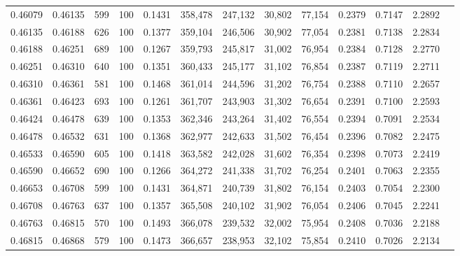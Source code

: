 \begin{tabular}{rrrrrrrrrrrrr}
0.46079 & 0.46135 &   599 & 100 &                                     0.1431 & 358,478 & 247,132 &  30,802 &  77,154 & 0.2379 & 0.7147 & 2.2892 \\
0.46135 & 0.46188 &   626 & 100 &                                     0.1377 & 359,104 & 246,506 &  30,902 &  77,054 & 0.2381 & 0.7138 & 2.2834 \\
0.46188 & 0.46251 &   689 & 100 &                                     0.1267 & 359,793 & 245,817 &  31,002 &  76,954 & 0.2384 & 0.7128 & 2.2770 \\
0.46251 & 0.46310 &   640 & 100 &                                     0.1351 & 360,433 & 245,177 &  31,102 &  76,854 & 0.2387 & 0.7119 & 2.2711 \\
0.46310 & 0.46361 &   581 & 100 &                                     0.1468 & 361,014 & 244,596 &  31,202 &  76,754 & 0.2388 & 0.7110 & 2.2657 \\
0.46361 & 0.46423 &   693 & 100 &                                     0.1261 & 361,707 & 243,903 &  31,302 &  76,654 & 0.2391 & 0.7100 & 2.2593 \\
0.46424 & 0.46478 &   639 & 100 &                                     0.1353 & 362,346 & 243,264 &  31,402 &  76,554 & 0.2394 & 0.7091 & 2.2534 \\
0.46478 & 0.46532 &   631 & 100 &                                     0.1368 & 362,977 & 242,633 &  31,502 &  76,454 & 0.2396 & 0.7082 & 2.2475 \\
0.46533 & 0.46590 &   605 & 100 &                                     0.1418 & 363,582 & 242,028 &  31,602 &  76,354 & 0.2398 & 0.7073 & 2.2419 \\
0.46590 & 0.46652 &   690 & 100 &                                     0.1266 & 364,272 & 241,338 &  31,702 &  76,254 & 0.2401 & 0.7063 & 2.2355 \\
0.46653 & 0.46708 &   599 & 100 &                                     0.1431 & 364,871 & 240,739 &  31,802 &  76,154 & 0.2403 & 0.7054 & 2.2300 \\
0.46708 & 0.46763 &   637 & 100 &                                     0.1357 & 365,508 & 240,102 &  31,902 &  76,054 & 0.2406 & 0.7045 & 2.2241 \\
0.46763 & 0.46815 &   570 & 100 &                                     0.1493 & 366,078 & 239,532 &  32,002 &  75,954 & 0.2408 & 0.7036 & 2.2188 \\
0.46815 & 0.46868 &   579 & 100 &                                     0.1473 & 366,657 & 238,953 &  32,102 &  75,854 & 0.2410 & 0.7026 & 2.2134 \\

\end{tabular}
